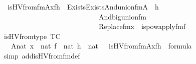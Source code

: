\begin{isabellebody}
\ \ {\isachardoublequoteopen}is{\isacharunderscore}{\kern0pt}HVfrom{\isacharunderscore}{\kern0pt}fm{\isacharparenleft}{\kern0pt}A{\isacharcomma}{\kern0pt}x{\isacharcomma}{\kern0pt}f{\isacharcomma}{\kern0pt}h{\isacharparenright}{\kern0pt}\ {\isasymequiv}\ Exists{\isacharparenleft}{\kern0pt}Exists{\isacharparenleft}{\kern0pt}And{\isacharparenleft}{\kern0pt}union{\isacharunderscore}{\kern0pt}fm{\isacharparenleft}{\kern0pt}A\ {\isacharhash}{\kern0pt}{\isacharplus}{\kern0pt}\ {}{\isacharcomma}{\kern0pt}{}{\isacharcomma}{\kern0pt}h\ {\isacharhash}{\kern0pt}{\isacharplus}{\kern0pt}\ {}{\isacharparenright}{\kern0pt}{\isacharcomma}{\kern0pt}\isanewline
\ \ \ \ \ \ \ \ \ \ \ \ \ \ \ \ \ \ \ \ \ \ \ \ \ \ \ \ And{\isacharparenleft}{\kern0pt}big{\isacharunderscore}{\kern0pt}union{\isacharunderscore}{\kern0pt}fm{\isacharparenleft}{\kern0pt}{}{\isacharcomma}{\kern0pt}{}{\isacharparenright}{\kern0pt}{\isacharcomma}{\kern0pt}\isanewline
\ \ \ \ \ \ \ \ \ \ \ \ \ \ \ \ \ \ \ \ \ \ \ \ \ \ \ \ Replace{\isacharunderscore}{\kern0pt}fm{\isacharparenleft}{\kern0pt}x\ {\isacharhash}{\kern0pt}{\isacharplus}{\kern0pt}\ {}{\isacharcomma}{\kern0pt}is{\isacharunderscore}{\kern0pt}powapply{\isacharunderscore}{\kern0pt}fm{\isacharparenleft}{\kern0pt}f\ {\isacharhash}{\kern0pt}{\isacharplus}{\kern0pt}\ {}{\isacharcomma}{\kern0pt}{}{\isacharcomma}{\kern0pt}{}{\isacharparenright}{\kern0pt}{\isacharcomma}{\kern0pt}{}{\isacharparenright}{\kern0pt}{\isacharparenright}{\kern0pt}{\isacharparenright}{\kern0pt}{\isacharparenright}{\kern0pt}{\isacharparenright}{\kern0pt}{\isachardoublequoteclose}\isanewline
\isanewline
{}\isamarkupfalse%
\ is{\isacharunderscore}{\kern0pt}HVfrom{\isacharunderscore}{\kern0pt}type\ {\isacharbrackleft}{\kern0pt}TC{\isacharbrackright}{\kern0pt}{\isacharcolon}{\kern0pt}\isanewline
\ \ {\isachardoublequoteopen}{\isasymlbrakk}\ A{\isasymin}nat{\isacharsemicolon}{\kern0pt}\ x\ {\isasymin}\ nat{\isacharsemicolon}{\kern0pt}\ f\ {\isasymin}\ nat{\isacharsemicolon}{\kern0pt}\ h\ {\isasymin}\ nat\ {\isasymrbrakk}\ {\isasymLongrightarrow}\ is{\isacharunderscore}{\kern0pt}HVfrom{\isacharunderscore}{\kern0pt}fm{\isacharparenleft}{\kern0pt}A{\isacharcomma}{\kern0pt}x{\isacharcomma}{\kern0pt}f{\isacharcomma}{\kern0pt}h{\isacharparenright}{\kern0pt}\ {\isasymin}\ formula{\isachardoublequoteclose}\isanewline
%
\isadelimproof
\ \ %
\endisadelimproof
%
\isatagproof
{}\isamarkupfalse%
\ {\isacharparenleft}{\kern0pt}simp\ add{\isacharcolon}{\kern0pt}is{\isacharunderscore}{\kern0pt}HVfrom{\isacharunderscore}{\kern0pt}fm{\isacharunderscore}{\kern0pt}def{\isacharparenright}{\kern0pt}%

\end{isabellebody}
